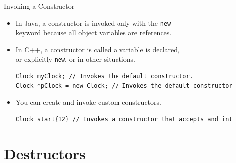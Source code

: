 \documentclass[14pt, aspectratio=1610, hyperref={pdfpagelayout=SinglePage}]{beamer}
\begin{document}
\begin{frame}[fragile]{Invoking a Constructor}
\begin{itemize}[<+->]
\item In Java, a constructor is invoked only with the \lstinline{new}\\ keyword because all object variables are references.
\item In C++, a constructor is called a variable is declared,\\
      or explicitly \lstinline{new}, or in other situations.\\
\begin{lstlisting}[basicstyle=\ttfamily\bfseries\small]
Clock myClock; // Invokes the default constructor.
Clock *pClock = new Clock; // Invokes the default constructor
\end{lstlisting}
\item You can create and invoke custom constructors.
\begin{lstlisting}[basicstyle=\ttfamily\bfseries\small]
Clock start{12} // Invokes a constructor that accepts and int
\end{lstlisting}
\end{itemize}
\end{frame}


\section{Destructors}
\end{document}
